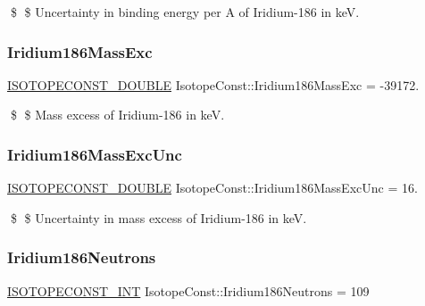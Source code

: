 \$ \$ Uncertainty in binding energy per A of Iridium-\/186 in keV. \mbox{\label{group___isotope_const-_iridium-_ir186_gac0c029ec1c933f4cca0c01bb3cd2abe4}} 
\subsubsection{\texorpdfstring{Iridium186\+Mass\+Exc}{Iridium186MassExc}}
{\footnotesize\ttfamily \mbox{\hyperlink{group___isotope_const-_macros_ga8f45a7272ce02c0b4c65c44636ed719a}{I\+S\+O\+T\+O\+P\+E\+C\+O\+N\+S\+T\+\_\+\+D\+O\+U\+B\+LE}} Isotope\+Const\+::\+Iridium186\+Mass\+Exc = -\/39172.}

\$ \$ Mass excess of Iridium-\/186 in keV. \mbox{\label{group___isotope_const-_iridium-_ir186_ga22e3c7007302d81a23cb159ffbbd41fa}} 
\subsubsection{\texorpdfstring{Iridium186\+Mass\+Exc\+Unc}{Iridium186MassExcUnc}}
{\footnotesize\ttfamily \mbox{\hyperlink{group___isotope_const-_macros_ga8f45a7272ce02c0b4c65c44636ed719a}{I\+S\+O\+T\+O\+P\+E\+C\+O\+N\+S\+T\+\_\+\+D\+O\+U\+B\+LE}} Isotope\+Const\+::\+Iridium186\+Mass\+Exc\+Unc = 16.}

\$ \$ Uncertainty in mass excess of Iridium-\/186 in keV. \mbox{\label{group___isotope_const-_iridium-_ir186_ga14e247f99cd406ff169791695e658669}} 
\subsubsection{\texorpdfstring{Iridium186\+Neutrons}{Iridium186Neutrons}}
{\footnotesize\ttfamily \mbox{\hyperlink{group___isotope_const-_macros_ga5f18360b3e99483a35c32d789e62621c}{I\+S\+O\+T\+O\+P\+E\+C\+O\+N\+S\+T\+\_\+\+I\+NT}} Isotope\+Const\+::\+Iridium186\+Neutrons = 109}

